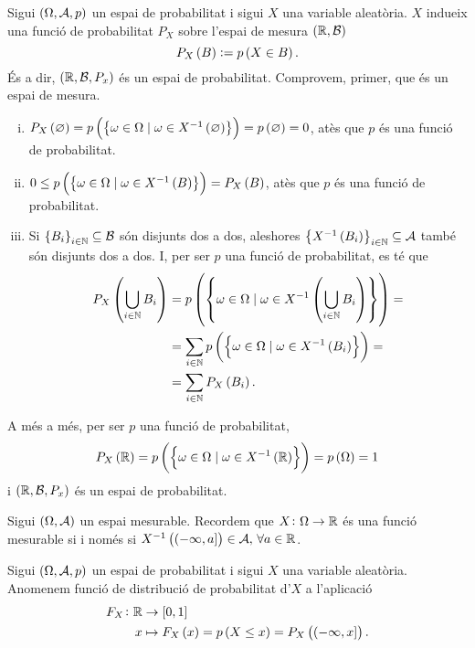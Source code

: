 \begin{obs}
    Sigui $\left(\Omega,\mathcal{A},p\right)$ un espai de probabilitat i sigui $X$ una variable aleatòria. $X$ indueix una funció de probabilitat $P_X$ sobre l'espai de mesura $\left(\mathbb{R},\mathcal{B}\right)$
    \[
        P_X\left( B\right):=p\left( X\in B\right).
    \]
    És a dir, $\left(\mathbb{R},\mathcal{B},P_x\right)$ és un espai de probabilitat. Comprovem, primer, que és un espai de mesura.
    \begin{enumerate}[i)]
        \item $P_X\left(\varnothing\right)=p\left(\left\{\omega\in\Omega\mid\omega\in X^{-1}\left( \varnothing\right)\right\}\right)=p\left(\varnothing\right)=0$, atès que $p$ és una funció de probabilitat.
        \item $0\leq p\left(\left\{\omega\in\Omega\mid\omega\in X^{-1}\left( B\right)\right\}\right) = P_X\left( B\right)$, atès que $p$ és una funció de probabilitat. 
        \item Si $\left\{ B_i\right\}_{i\in\mathbb{N}}\subseteq\mathcal{B}$ són disjunts dos a dos, aleshores $\left\{ X^{-1}\left( B_i\right)\right\}_{i\in\mathbb{N}}\subseteq\mathcal{A}$ també són disjunts dos a dos. I, per ser $p$ una funció de probabilitat, es té que
        \begin{align*}
            P_X\left( \bigcup_{i\in\mathbb{N}} B_i\right) &= p\left(\left\{\omega\in\Omega\mid\omega\in X^{-1}\left( \bigcup_{i\in\mathbb{N}} B_i\right)\right\}\right) =\\
            &= \sum_{i\in\mathbb{N}} p\left(\left\{\omega\in\Omega\mid\omega\in X^{-1}\left( B_i\right)\right\}\right)=\\
            &=\sum_{i\in\mathbb{N}}P_X\left( B_i\right).
        \end{align*}
    \end{enumerate}
    A més a més, per ser $p$ una funció de probabilitat,
    \[
        P_X\left(\mathbb{R}\right) = p\left(\left\{\omega\in\Omega\mid\omega\in X^{-1}\left(\mathbb{R}\right)\right\}\right) = p\left(\Omega\right)=1
    \]
    i $\left(\mathbb{R},\mathcal{B},P_x\right)$ és un espai de probabilitat.
\end{obs}

\begin{obs}
    Sigui $\left(\Omega,\mathcal{A}\right)$ un espai mesurable. Recordem que $X\colon\Omega\to\mathbb{R}$ és una funció mesurable si i només si $X^{-1}\left(\left(-\infty, a\right]\right)\in\mathcal{A},\,\forall a\in\mathbb{R}$.
\end{obs}

\begin{defi}
    Sigui $\left(\Omega,\mathcal{A}, p\right)$ un espai de probabilitat i sigui $X$ una variable aleatòria. Anomenem funció de distribució de probabilitat d'$X$ a l'aplicació
    \begin{align*}
        F_X\colon\mathbb{R} &\to\left[ 0,1\right]\\
        x &\mapsto F_X\left( x\right) = p\left( X\leq x\right) = P_X\left(\left(-\infty,x\right]\right).
    \end{align*}
\end{defi}

